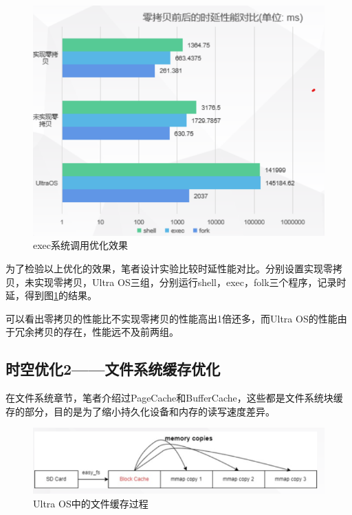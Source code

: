 \begin{figure}[htbp]
	\centering
	\includegraphics[scale=0.75]{figures/10-04/10-04-04.png}
	\caption{exec系统调用优化效果}
	\label{exam-4}
\end{figure}

为了检验以上优化的效果，笔者设计实验比较时延性能对比。分别设置实现零拷贝，未实现零拷贝，Ultra OS三组，分别运行shell，exec，folk三个程序，记录时延，得到图\ref{exam-4}的结果。

可以看出零拷贝的性能比不实现零拷贝的性能高出1倍还多，而Ultra OS的性能由于冗余拷贝的存在，性能远不及前两组。

\subsection{时空优化2——文件系统缓存优化}

在文件系统章节，笔者介绍过PageCache和BufferCache，这些都是文件系统块缓存的部分，目的是为了缩小持久化设备和内存的读写速度差异。

\begin{figure}[htbp]
	\centering
	\includegraphics[scale=0.75]{figures/10-04/10-04-05.png}
	\caption{Ultra OS中的文件缓存过程}
	\label{exam-5}
\end{figure}

